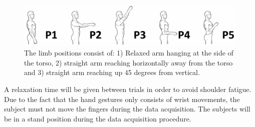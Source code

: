 \begin{figure}[H]                    
	\includegraphics[width=1\textwidth]{figures/protocol/limb_position}  %
	\caption{The limb positions consist of: 1) Relaxed arm hanging at the side of the torso, 2) straight arm reaching horizontally away from the torso and 3) straight arm reaching up 45 degrees from vertical.}
	\label{fig:limbpos}  %
\end{figure}

A relaxation time will be given between trials in order to avoid shoulder fatigue.
Due to the fact that the hand gestures only consists of wrist movements, the subject must not move the fingers during the data acquisition.
The subjects will be in a stand position during the data acquisition procedure.

